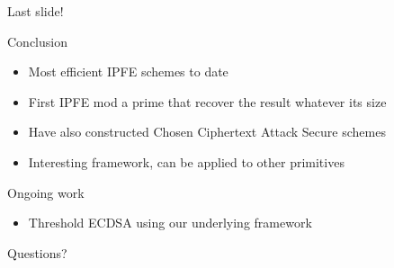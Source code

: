 \documentclass[10pt]{beamer}
\begin{document}
\begin{frame}{Last slide!}
\begin{block}{Conclusion}
\begin{itemize}
\item Most efficient IPFE schemes to date
\item First IPFE mod a prime that recover the result whatever its size
\item Have also constructed Chosen Ciphertext Attack Secure schemes 
\item Interesting framework, can be applied to other primitives
\end{itemize}
\end{block}
\begin{block}{Ongoing work}
\begin{itemize}
\item Threshold ECDSA using our underlying framework
\end{itemize}
\end{block}
\end{frame}

\begin{frame}[standout]
  Questions?
\end{frame}


\begin{frame}
%
%


\end{frame}
\end{document}
